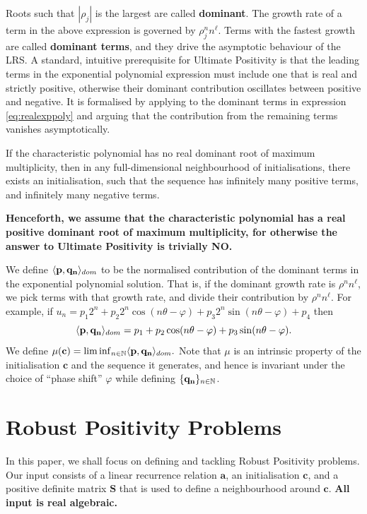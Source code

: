 Roots such that $|\rho_j|$ is the largest are called \textbf{dominant}. The growth rate of a term in the above expression is governed by $\rho_j^n n^\ell$. Terms with the fastest growth are called \textbf{dominant terms}, and they drive the asymptotic behaviour of the LRS. A standard, intuitive prerequisite for Ultimate Positivity is that the leading terms in the exponential polynomial expression must include one that is real and strictly positive, otherwise their dominant contribution oscillates between positive and negative. It is formalised by applying \cite[Lemma 4]{Braverman06} to the dominant terms in expression \ref{eq:realexppoly} and arguing that the contribution from the remaining terms vanishes asymptotically. 
\begin{proposition}
\label{prop:folklore}
If the characteristic polynomial has no real dominant root of maximum multiplicity, then in any full-dimensional neighbourhood of initialisations, there exists an initialisation, such that the sequence has infinitely many positive terms, and infinitely many negative terms.
\end{proposition}

\textbf{Henceforth, we assume that the characteristic polynomial has a real positive dominant root of maximum multiplicity, for otherwise the answer to Ultimate Positivity is trivially NO.} 

We define $\langle\mathbf{p}, \mathbf{q_n}\rangle_{dom}$ to be the normalised contribution of the dominant terms in the exponential polynomial solution. That is, if the dominant growth rate is $\rho^n n^\ell$, we pick terms with that growth rate, and divide their contribution by $\rho^n n^\ell$. For example, if
$
u_n = p_1 2^n + p_2 2^n\cos (n\theta -\varphi) + p_3 2^n \sin (n\theta-\varphi) + p_4
$
then $$\langle\mathbf{p}, \mathbf{q_n}\rangle_{dom} = p_1  + p_2 \cos (n\theta-\varphi) + p_3 \sin (n\theta-\varphi).$$
We define
$
\mu(\mathbf{c}) = \liminf_{n \in \mathbb{N}} \langle\mathbf{p}, \mathbf{q_n}\rangle_{dom}.
$
Note that $\mu$ is an intrinsic property of the initialisation $\mathbf{c}$ and the sequence it generates, and hence is invariant under the choice of ``phase shift'' $\varphi$ while defining $\{\mathbf{q_n}\}_{n\in \mathbb{N}}$.

\section{Robust Positivity Problems}
\label{section:problems}

In this paper, we shall focus on defining and tackling Robust Positivity problems. Our input consists of a linear recurrence relation $\mathbf{a}$, an initialisation $\mathbf{c}$, and a positive definite matrix $\mathbf{S}$ that is used to define a neighbourhood around $\mathbf{c}$. \textbf{All input is real algebraic.}

